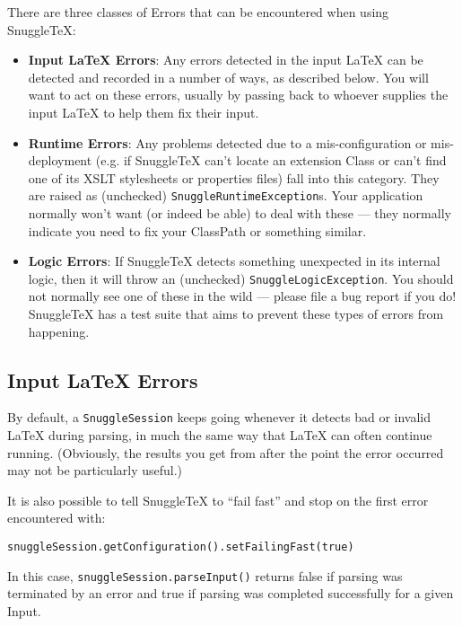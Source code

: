 
There are three classes of Errors that can be encountered when using SnuggleTeX:

\begin{itemize}

\item \textbf{Input LaTeX Errors}: Any errors detected in the input LaTeX can
  be detected and recorded in a number of ways, as described below. You will
  want to act on these errors, usually by passing back to whoever supplies
  the input LaTeX to help them fix their input.

\item \textbf{Runtime Errors}: Any problems detected due to a mis-configuration
  or mis-deployment (e.g. if SnuggleTeX can't locate an extension Class or can't
  find one of its XSLT stylesheets or properties files) fall into this category.
  They are raised as (unchecked) \verb|SnuggleRuntimeException|s. Your application
  normally won't want (or indeed be able) to deal with these --- they normally
  indicate you need to fix your ClassPath or something similar.

\item \textbf{Logic Errors}: If SnuggleTeX detects something unexpected in its
  internal logic, then it will throw an (unchecked) \verb|SnuggleLogicException|.
  You should not normally see one of these in the wild --- please file a bug report
  if you do! SnuggleTeX has a test suite that aims to prevent these types of errors
  from happening.
\end{itemize}

\subsection*{Input LaTeX Errors}

By default, a \verb|SnuggleSession| keeps going whenever it detects bad or
invalid LaTeX during parsing, in much the same way that LaTeX can often
continue running.
(Obviously, the results you get from after the point the error occurred
may not be particularly useful.)

It is also possible to tell SnuggleTeX to ``fail fast'' and stop on the first error
encountered with:
\begin{verbatim}snuggleSession.getConfiguration().setFailingFast(true)\end{verbatim}
In this case, \verb|snuggleSession.parseInput()| returns false if parsing was
terminated by an error and true if parsing was completed successfully for
a given Input.

